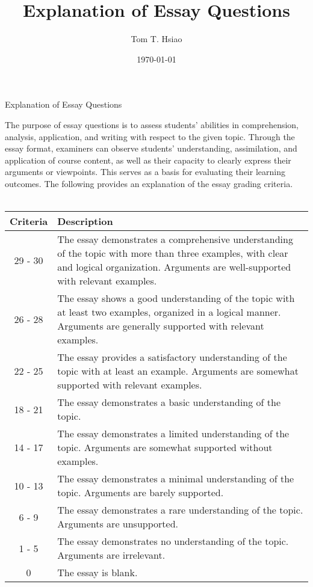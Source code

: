 \documentclass{article}
\title{Explanation of Essay Questions}
\author{Tom T. Hsiao}
\date{\today}
\begin{document}
\thispagestyle{fancy}
\begin{center}
\fontsize{16pt}{16pt}\selectfont Explanation of Essay Questions
\end{center}
\fontsize{14pt}{14pt}\selectfont
The purpose of essay questions is to assess students’ abilities in comprehension, analysis, application, and writing with respect to the given topic. Through the essay format, examiners can observe students’ understanding, assimilation, and application of course content, as well as their capacity to clearly express their arguments or viewpoints. This serves as a basis for evaluating their learning outcomes. The following provides an explanation of the essay grading criteria. \\
\\ \vspace{1em} 
\begin{tabular}{|c|p{15cm}|}
\hline
Criteria & Description \\
\hline
29 - 30 & The essay demonstrates a comprehensive understanding of the topic with more than three examples, with clear and logical organization. Arguments are well-supported with relevant examples. \\
\hline
26 - 28 & The essay shows a good understanding of the topic with at least two examples, organized in a logical manner. Arguments are generally supported with relevant examples. \\
\hline
22 - 25 & The essay provides a satisfactory understanding of the topic with at least an example. Arguments are somewhat supported with relevant examples. \\
\hline
18 - 21 & The essay demonstrates a basic understanding of the topic. \\
\hline
14 - 17 & The essay demonstrates a limited understanding of the topic. Arguments are somewhat supported without examples. \\
\hline
10 - 13 & The essay demonstrates a minimal understanding of the topic. Arguments are barely supported. \\
\hline
6 - 9 & The essay demonstrates a rare understanding of the topic. Arguments are unsupported. \\
\hline
1 - 5 & The essay demonstrates no understanding of the topic. Arguments are irrelevant. \\
\hline
0 & The essay is blank. \\
\hline
\end{tabular}
\end{document}
